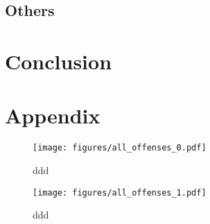 \documentclass[onecolumn]{mysimple}
\begin{document}
\subsection*{Others}

\section*{Conclusion}

\section*{Appendix}

\begin{figure}
  \centering
  \caption{ddd}
  \texttt{[image: figures/all\_offenses\_0.pdf]}
\end{figure}

\begin{figure}
  \caption{ddd}
  \centering
  \texttt{[image: figures/all\_offenses\_1.pdf]}
\end{figure}
\end{document}
